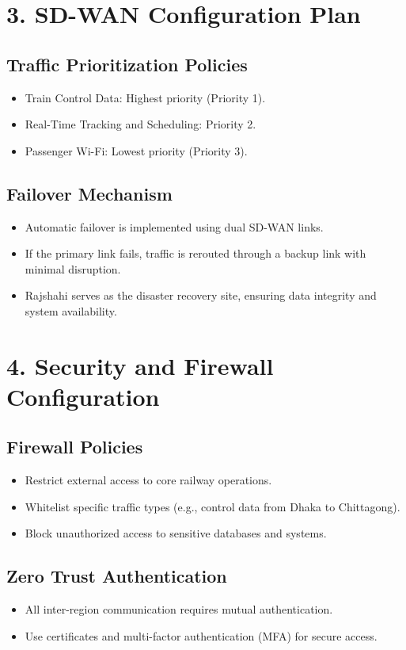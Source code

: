 \documentclass[12pt]{article}
\begin{document}
\section*{3. SD-WAN Configuration Plan}

\subsection*{Traffic Prioritization Policies}
\begin{itemize}
    \item Train Control Data: Highest priority (Priority 1).
    \item Real-Time Tracking and Scheduling: Priority 2.
    \item Passenger Wi-Fi: Lowest priority (Priority 3).
\end{itemize}

\subsection*{Failover Mechanism}
\begin{itemize}
    \item Automatic failover is implemented using dual SD-WAN links.
    \item If the primary link fails, traffic is rerouted through a backup link with minimal disruption.
    \item Rajshahi serves as the disaster recovery site, ensuring data integrity and system availability.
\end{itemize}

\section*{4. Security and Firewall Configuration}

\subsection*{Firewall Policies}
\begin{itemize}
    \item Restrict external access to core railway operations.
    \item Whitelist specific traffic types (e.g., control data from Dhaka to Chittagong).
    \item Block unauthorized access to sensitive databases and systems.
\end{itemize}

\subsection*{Zero Trust Authentication}
\begin{itemize}
    \item All inter-region communication requires mutual authentication.
    \item Use certificates and multi-factor authentication (MFA) for secure access.
\end{itemize}
\end{document}
